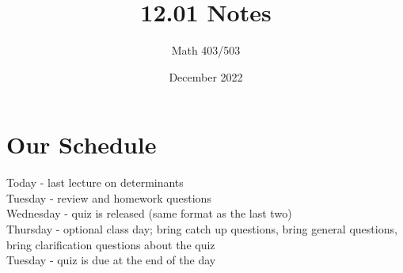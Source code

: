 \documentclass{article}
\title{12.01 Notes}
\author{Math 403/503}
\date{December 2022}
\begin{document}
\maketitle

\section{Our Schedule}
Today - last lecture on determinants \\
Tuesday - review and homework questions \\
Wednesday - quiz is released (same format as the last two) \\
Thursday - optional class day; bring catch up questions, bring general questions, bring clarification questions about the quiz \\
Tuesday - quiz is due at the end of the day 
\end{document}
